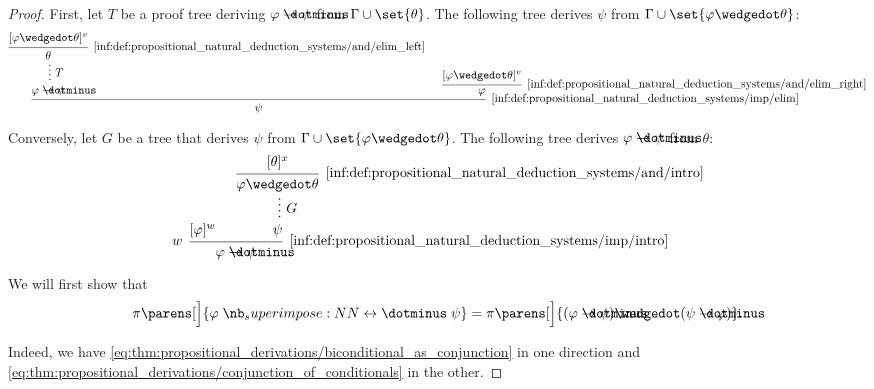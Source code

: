 \begin{proof}

  First, let \( T \) be a proof tree deriving \( \varphi \synimplies \psi \) from \( \Gamma \cup \set{ \theta } \). The following tree derives \( \psi \) from \( \Gamma \cup \set{ \varphi \synwedge \theta } \):
  \begin{equation*}
    \begin{prooftree}
      \hypo{ [\varphi \synwedge \theta]^v }
      \infer1[\ref{inf:def:propositional_natural_deduction_systems/and/elim_left}]{ \theta }

      \ellipsis {\( T \)} {\varphi \synimplies \psi}

      \hypo{ [\varphi \synwedge \theta]^v }
      \infer1[\ref{inf:def:propositional_natural_deduction_systems/and/elim_right}]{ \varphi }

      \infer2[\ref{inf:def:propositional_natural_deduction_systems/imp/elim}]{ \psi }
    \end{prooftree}
  \end{equation*}

  Conversely, let \( G \) be a tree that derives \( \psi \) from \( \Gamma \cup \set{ \varphi \synwedge \theta } \). The following tree derives \( \varphi \synimplies \psi \) from \( \theta \):
  \begin{equation*}
    \begin{prooftree}
      \hypo{ [\varphi]^w }
      \hypo{ [\theta]^x }
      \infer1[\ref{inf:def:propositional_natural_deduction_systems/and/intro}]{ \varphi \synwedge \theta }

      \ellipsis {\( G \)} {\psi}

      \infer[left label=\( w \)]2[\ref{inf:def:propositional_natural_deduction_systems/imp/intro}]{ \varphi \synimplies \psi }
    \end{prooftree}
  \end{equation*}

   We will first show that
  \begin{equation*}
    \pi\parens[\Big]{ \varphi \syniff \psi } = \pi\parens[\Big]{ (\varphi \synimplies \psi) \synwedge (\psi \synimplies \varphi) }.
  \end{equation*}

  Indeed, we have \eqref{eq:thm:propositional_derivations/biconditional_as_conjunction} in one direction and \eqref{eq:thm:propositional_derivations/conjunction_of_conditionals} in the other.


\end{proof}
